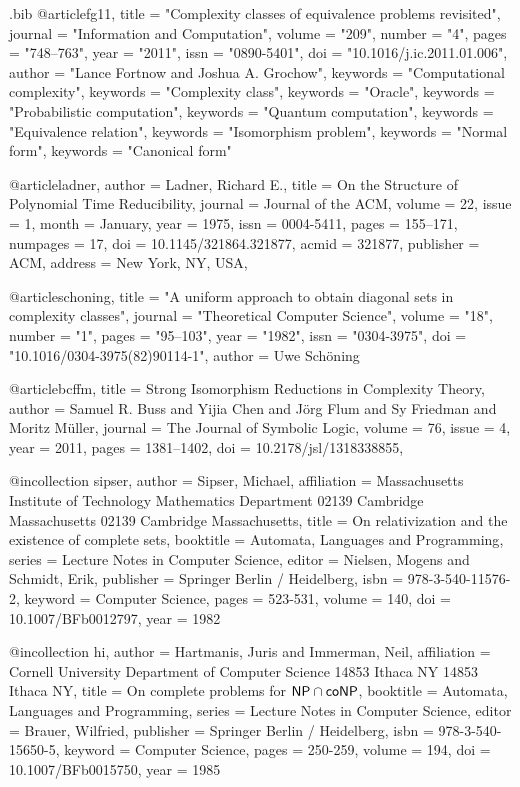 \begin{filecontents*}{\jobname.bib}
@article{fg11,
title = "Complexity classes of equivalence problems revisited",
journal = "Information and Computation",
volume = "209",
number = "4",
pages = "748--763",
year = "2011",
issn = "0890-5401",
doi = "10.1016/j.ic.2011.01.006",
author = "Lance Fortnow and Joshua A. Grochow",
keywords = "Computational complexity",
keywords = "Complexity class",
keywords = "Oracle",
keywords = "Probabilistic computation",
keywords = "Quantum computation",
keywords = "Equivalence relation",
keywords = "Isomorphism problem",
keywords = "Normal form",
keywords = "Canonical form"
}

@article{ladner,
 author = {Ladner, Richard E.},
 title = {{On the Structure of Polynomial Time Reducibility}},
 journal = {Journal of the ACM},
 volume = {22},
 issue = {1},
 month = {January},
 year = {1975},
 issn = {0004-5411},
 pages = {155--171},
 numpages = {17},
 doi = {10.1145/321864.321877},
 acmid = {321877},
 publisher = {ACM},
 address = {New York, NY, USA},
}

@article{schoning,
title = "A uniform approach to obtain diagonal sets in complexity classes",
journal = "Theoretical Computer Science",
volume = "18",
number = "1",
pages = "95--103",
year = "1982",
issn = "0304-3975",
doi = "10.1016/0304-3975(82)90114-1",
author = {Uwe Sch\"{o}ning}
}

@article{bcffm,
title = {Strong Isomorphism Reductions in Complexity Theory},
author = {Samuel R. Buss and Yijia Chen and J\"{o}rg Flum and Sy Friedman and Moritz M\"{u}ller},
journal = {The Journal of Symbolic Logic},
volume = 76,
issue = 4,
year = 2011,
pages = {1381--1402},
doi = {10.2178/jsl/1318338855},
}

@incollection {sipser,
author = {Sipser, Michael},
affiliation = {Massachusetts Institute of Technology Mathematics Department 02139 Cambridge Massachusetts 02139 Cambridge Massachusetts},
title = {On relativization and the existence of complete sets},
booktitle = {Automata, Languages and Programming},
series = {Lecture Notes in Computer Science},
editor = {Nielsen, Mogens and Schmidt, Erik},
publisher = {Springer Berlin / Heidelberg},
isbn = {978-3-540-11576-2},
keyword = {Computer Science},
pages = {523-531},
volume = {140},
doi = {10.1007/BFb0012797},
year = {1982}
}

@incollection {hi,
author = {Hartmanis, Juris and Immerman, Neil},
affiliation = {Cornell University Department of Computer Science 14853 Ithaca NY 14853 Ithaca NY},
title = {On complete problems for {$\NP\cap\coNP$}},
booktitle = {Automata, Languages and Programming},
series = {Lecture Notes in Computer Science},
editor = {Brauer, Wilfried},
publisher = {Springer Berlin / Heidelberg},
isbn = {978-3-540-15650-5},
keyword = {Computer Science},
pages = {250-259},
volume = {194},
doi = {10.1007/BFb0015750},
year = {1985}
}


\end{filecontents*}
